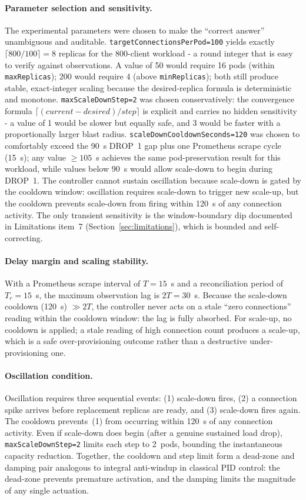 \documentclass[twocolumn]{svjour3}
\begin{document}
\paragraph{Parameter selection and sensitivity.}
The experimental parameters were chosen to make the ``correct answer'' unambiguous and auditable.  \texttt{targetConnectionsPerPod=100} yields exactly $\lceil800/100\rceil=8$ replicas for the 800-client workload - a round integer that is easy to verify against observations.  A value of 50 would require 16 pods (within \texttt{maxReplicas}); 200 would require 4 (above \texttt{minReplicas}); both still produce stable, exact-integer scaling because the desired-replica formula is deterministic and monotone.  \texttt{maxScaleDownStep=2} was chosen conservatively: the convergence formula $\lceil(current-desired)/step\rceil$ is explicit and carries no hidden sensitivity - a value of 1 would be slower but equally safe, and 3 would be faster with a proportionally larger blast radius.  \texttt{scaleDownCooldownSeconds=120} was chosen to comfortably exceed the 90~s DROP~1 gap plus one Prometheus scrape cycle (15~s); any value $\geq 105$~s achieves the same pod-preservation result for this workload, while values below 90~s would allow scale-down to begin during DROP~1.  The controller cannot sustain oscillation because scale-down is gated by the cooldown window: oscillation requires scale-down to trigger new scale-up, but the cooldown prevents scale-down from firing within 120~s of any connection activity.  The only transient sensitivity is the window-boundary dip documented in Limitations item~7 (Section~\ref{sec:limitations}), which is bounded and self-correcting.

\paragraph{Delay margin and scaling stability.}
With a Prometheus scrape interval of $T=15$~s and a reconciliation period of $T_r=15$~s, the maximum observation lag is $2T=30$~s.  Because the scale-down cooldown (120~s) $\gg 2T$, the controller never acts on a stale ``zero connections'' reading within the cooldown window: the lag is fully absorbed.  For scale-up, no cooldown is applied; a stale reading of high connection count produces a scale-up, which is a safe over-provisioning outcome rather than a destructive under-provisioning one.

\paragraph{Oscillation condition.}
Oscillation requires three sequential events: (1) scale-down fires, (2) a connection spike arrives before replacement replicas are ready, and (3) scale-down fires again.  The cooldown prevents~(1) from occurring within 120~s of any connection activity.  Even if scale-down does begin (after a genuine sustained load drop), \texttt{maxScaleDownStep=2} limits each step to 2~pods, bounding the instantaneous capacity reduction.  Together, the cooldown and step limit form a dead-zone and damping pair analogous to integral anti-windup in classical PID control: the dead-zone prevents premature activation, and the damping limits the magnitude of any single actuation.
\end{document}
